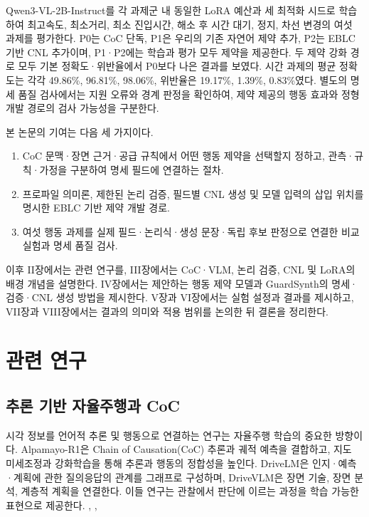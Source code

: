 \documentclass[10pt,a4paper,twocolumn]{article}\usepackage[margin=18mm]{geometry}\usepackage{fontspec,kotex}
\begin{document}
Qwen3-VL-2B-Instruct를 각 과제군 내 동일한 LoRA 예산과 세 최적화 시드로 학습하여 최고속도, 최소거리, 최소 진입시간, 해소 후 시간 대기, 정지, 차선 변경의 여섯 과제를 평가한다. P0는 CoC 단독, P1은 우리의 기존 자연어 제약 추가, P2는 EBLC 기반 CNL 추가이며, P1·P2에는 학습과 평가 모두 제약을 제공한다. 두 제약 강화 경로 모두 기본 정확도·위반율에서 P0보다 나은 결과를 보였다. 시간 과제의 평균 정확도는 각각 49.86\%, 96.81\%, 98.06\%, 위반율은 19.17\%, 1.39\%, 0.83\%였다. 별도의 명세 품질 검사에서는 지원 오류와 경계 판정을 확인하여, 제약 제공의 행동 효과와 정형 개발 경로의 검사 가능성을 구분한다.\par

본 논문의 기여는 다음 세 가지이다.\par

\begin{enumerate}
\item CoC 문맥·장면 근거·공급 규칙에서 어떤 행동 제약을 선택할지 정하고, 관측·규칙·가정을 구분하여 명세 필드에 연결하는 절차.
\item 프로파일 의미론, 제한된 논리 검증, 필드별 CNL 생성 및 모델 입력의 삽입 위치를 명시한 EBLC 기반 제약 개발 경로.
\item 여섯 행동 과제를 실제 필드·논리식·생성 문장·독립 후보 판정으로 연결한 비교 실험과 명세 품질 검사.
\end{enumerate}

이후 II장에서는 관련 연구를, III장에서는 CoC·VLM, 논리 검증, CNL 및 LoRA의 배경 개념을 설명한다. IV장에서는 제안하는 행동 제약 모델과 GuardSynth의 명세·검증·CNL 생성 방법을 제시한다. V장과 VI장에서는 실험 설정과 결과를 제시하고, VII장과 VIII장에서는 결과의 의미와 적용 범위를 논의한 뒤 결론을 정리한다.\par
\section{관련 연구}

\subsection{추론 기반 자율주행과 CoC}

시각 정보를 언어적 추론 및 행동으로 연결하는 연구는 자율주행 학습의 중요한 방향이다. Alpamayo-R1은 Chain of Causation(CoC) 추론과 궤적 예측을 결합하고, 지도 미세조정과 강화학습을 통해 추론과 행동의 정합성을 높인다. DriveLM은 인지·예측·계획에 관한 질의응답의 관계를 그래프로 구성하며, DriveVLM은 장면 기술, 장면 분석, 계층적 계획을 연결한다. 이들 연구는 관찰에서 판단에 이르는 과정을 학습 가능한 표현으로 제공한다. \cite{r1}, \cite{r2}, \cite{r3}\par
\end{document}
